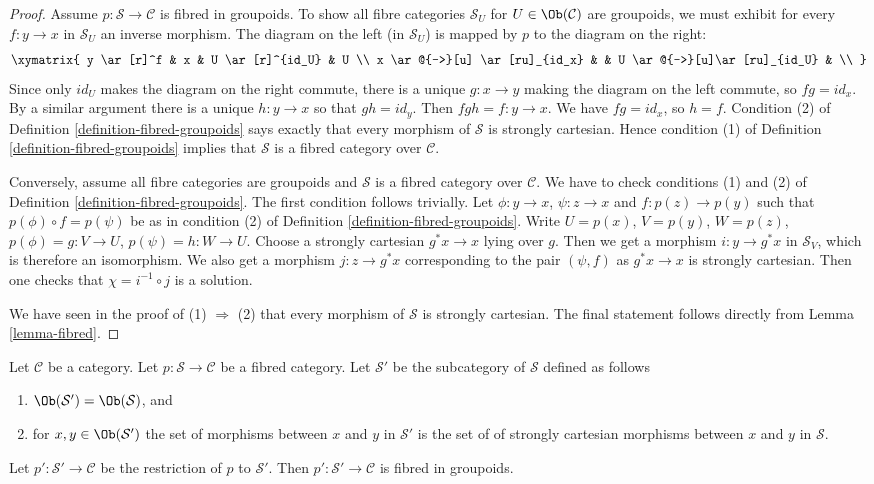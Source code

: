 \begin{proof}
Assume $p : \mathcal{S} \to \mathcal{C}$ is fibred in groupoids.
To show all fibre categories $\mathcal{S}_U$ for
$U \in \Ob(\mathcal{C})$
are groupoids, we must exhibit for every $f : y \to x$ in $\mathcal{S}_U$ an
inverse morphism.  The diagram on the left (in $\mathcal{S}_U$) is mapped by
$p$ to the diagram on the right:
$$
\xymatrix{
y \ar[r]^f & x & U \ar[r]^{id_U} & U \\
x \ar@{-->}[u] \ar[ru]_{id_x} & & U \ar@{-->}[u]\ar[ru]_{id_U} & \\
}
$$
Since only $id_U$ makes the diagram on the right commute, there is a unique
$g : x \to y$ making the diagram on the left commute, so $fg = id_x$.  By a
similar argument there is a unique $h : y \to x$ so that $gh = id_y$.  Then
$fgh = f : y \to x$.  We have $fg = id_x$, so $h = f$.
Condition (2) of Definition \ref{definition-fibred-groupoids} says exactly
that every morphism of $\mathcal{S}$ is strongly cartesian. Hence condition
(1) of Definition \ref{definition-fibred-groupoids} implies that
$\mathcal{S}$ is a fibred category over $\mathcal{C}$.

\medskip\noindent
Conversely, assume all fibre categories are groupoids and
$\mathcal{S}$ is a fibred category over $\mathcal{C}$.
We have to check conditions (1) and (2) of
Definition \ref{definition-fibred-groupoids}.
The first condition follows trivially. Let $\phi : y \to x$,
$\psi : z \to x$ and $f : p(z) \to p(y)$ such that
$p(\phi) \circ f = p(\psi)$ be as in condition (2) of
Definition \ref{definition-fibred-groupoids}.
Write $U = p(x)$, $V = p(y)$, $W = p(z)$, $p(\phi) = g : V \to U$,
$p(\psi) = h : W \to U$. Choose a strongly cartesian $g^*x \to x$
lying over $g$. Then we get a morphism $i : y \to g^*x$ in
$\mathcal{S}_V$, which is therefore an isomorphism. We
also get a morphism $j : z \to g^*x$ corresponding to
the pair $(\psi, f)$ as $g^*x \to x$ is strongly cartesian.
Then one checks that $\chi = i^{-1} \circ j$ is a solution.

\medskip\noindent
We have seen in the proof of (1) $\Rightarrow$ (2) that
every morphism of $\mathcal{S}$ is strongly cartesian.
The final statement follows directly from Lemma \ref{lemma-fibred}.
\end{proof}

\begin{lemma}
\label{lemma-fibred-gives-fibred-groupoids}
Let $\mathcal{C}$ be a category.
Let $p : \mathcal{S} \to \mathcal{C}$ be a fibred category.
Let $\mathcal{S}'$ be the subcategory of $\mathcal{S}$ defined
as follows
\begin{enumerate}
\item $\Ob(\mathcal{S}') = \Ob(\mathcal{S})$, and
\item for $x, y \in \Ob(\mathcal{S}')$ the set of morphisms between $x$
and $y$ in $\mathcal{S}'$ is the set of of strongly cartesian morphisms between
$x$ and $y$ in $\mathcal{S}$.
\end{enumerate}
Let $p' : \mathcal{S}' \to \mathcal{C}$ be the restriction of $p$
to $\mathcal{S}'$. Then $p' : \mathcal{S}' \to \mathcal{C}$ is fibred
in groupoids.
\end{lemma}

